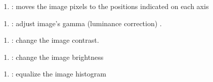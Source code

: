 \documentclass[letterpaper,10pt,english]{sphinxmanual}
\begin{document}
\begin{enumerate}
%
\setcounter{enumi}{6}
\item {} 
: moves the image pixels to the positions indicated on each axis

\end{enumerate}

\begin{enumerate}
%
\setcounter{enumi}{7}
\item {} 
: adjust image’s gamma (luminance correction) .

\end{enumerate}

\begin{enumerate}
%
\setcounter{enumi}{8}
\item {} 
: change the image contrast.

\end{enumerate}

\begin{enumerate}
%
\setcounter{enumi}{9}
\item {} 
: change the image brightness

\end{enumerate}

\begin{enumerate}
%
\setcounter{enumi}{10}
\item {} 
: equalize the image histogram

\end{enumerate}
\end{document}
